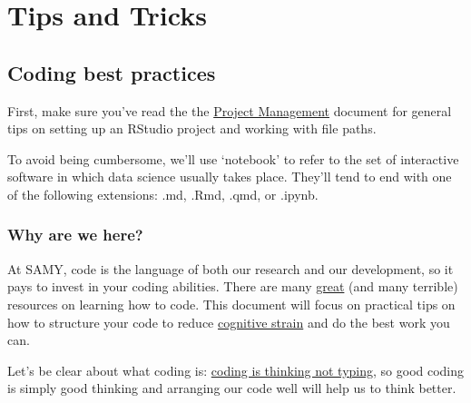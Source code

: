 \documentclass[
  letterpaper,
  DIV=11,
  numbers=noendperiod]{scrreprt}
\begin{document}
\part{Tips and Tricks}

\chapter{Coding best practices}\label{coding-best-practices}

First, make sure you've read the the
\href{project_management.qmd}{Project Management} document for general
tips on setting up an RStudio project and working with file paths.

\begin{tcolorbox}[enhanced jigsaw, opacitybacktitle=0.6, breakable, title=\textcolor{quarto-callout-note-color}{\faInfo}\hspace{0.5em}{Note}, arc=.35mm, colframe=quarto-callout-note-color-frame, colbacktitle=quarto-callout-note-color!10!white, left=2mm, bottomrule=.15mm, opacityback=0, toprule=.15mm, bottomtitle=1mm, toptitle=1mm, titlerule=0mm, leftrule=.75mm, colback=white, rightrule=.15mm, coltitle=black]

To avoid being cumbersome, we'll use `notebook' to refer to the set of
interactive software in which data science usually takes place. They'll
tend to end with one of the following extensions: .md, .Rmd, .qmd, or
.ipynb.

\end{tcolorbox}

\section{Why are we here?}\label{why-are-we-here}

At SAMY, code is the language of both our research and our development,
so it pays to invest in your coding abilities. There are many
\hyperref[great-coding-resources]{great} (and many terrible) resources
on learning how to code. This document will focus on practical tips on
how to structure your code to reduce
\href{https://link.springer.com/article/10.1007/s10648-019-09465-5}{cognitive
strain} and do the best work you can.

Let's be clear about what coding is:
\href{https://news.ycombinator.com/item?id=40103407\#:~:text=Programming\%20Is\%20Mostly\%20Thinking\%20(2014)\%20\%7C\%20Hacker\%20News&text=While\%20that\%20may\%20be\%20true,at\%20all\%20is\%20extremely\%20limited.}{coding
is thinking not typing}, so good coding is simply good thinking and
arranging our code well will help us to think better.
\end{document}
